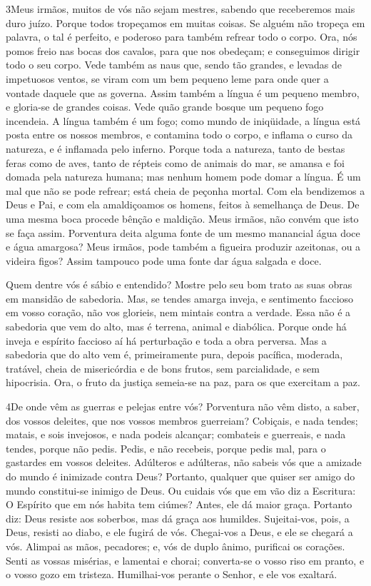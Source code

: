 \medskip

\lettrine{3} Meus irmãos, muitos de vós não sejam mestres,
sabendo que receberemos mais duro juízo. Porque todos tropeçamos
em muitas coisas. Se alguém não tropeça em palavra, o tal é
perfeito, e poderoso para também refrear todo o corpo. Ora, nós
pomos freio nas bocas dos cavalos, para que nos obedeçam; e
conseguimos dirigir todo o seu corpo. Vede também as naus que,
sendo tão grandes, e levadas de impetuosos ventos, se viram com um
bem pequeno leme para onde quer a vontade daquele que as governa.
Assim também a língua é um pequeno membro, e gloria-se de
grandes coisas. Vede quão grande bosque um pequeno fogo incendeia.
A língua também é um fogo; como mundo de iniqüidade, a língua
está posta entre os nossos membros, e contamina todo o corpo, e
inflama o curso da natureza, e é inflamada pelo inferno. Porque
toda a natureza, tanto de bestas feras como de aves, tanto de
répteis como de animais do mar, se amansa e foi domada pela natureza
humana; mas nenhum homem pode domar a língua. É um mal que não
se pode refrear; está cheia de peçonha mortal. Com ela
bendizemos a Deus e Pai, e com ela amaldiçoamos os homens, feitos à
semelhança de Deus. De uma mesma boca procede bênção e
maldição. Meus irmãos, não convém que isto se faça assim.
Porventura deita alguma fonte de um mesmo manancial água doce
e água amargosa? Meus irmãos, pode também a figueira produzir
azeitonas, ou a videira figos? Assim tampouco pode uma fonte dar
água salgada e doce.

Quem dentre vós é sábio e entendido? Mostre pelo seu bom trato as
suas obras em mansidão de sabedoria. Mas, se tendes amarga
inveja, e sentimento faccioso em vosso coração, não vos glorieis,
nem mintais contra a verdade. Essa não é a sabedoria que vem
do alto, mas é terrena, animal e diabólica. Porque onde há
inveja e espírito faccioso aí há perturbação e toda a obra perversa.
Mas a sabedoria que do alto vem é, primeiramente pura, depois
pacífica, moderada, tratável, cheia de misericórdia e de bons
frutos, sem parcialidade, e sem hipocrisia. Ora, o fruto da
justiça semeia-se na paz, para os que exercitam a paz.

\medskip

\lettrine{4} De onde vêm as guerras e pelejas entre vós?
Porventura não vêm disto, a saber, dos vossos deleites, que nos
vossos membros guerreiam? Cobiçais, e nada tendes; matais, e
sois invejosos, e nada podeis alcançar; combateis e guerreais, e
nada tendes, porque não pedis. Pedis, e não recebeis, porque
pedis mal, para o gastardes em vossos deleites. Adúlteros e
adúlteras, não sabeis vós que a amizade do mundo é inimizade contra
Deus? Portanto, qualquer que quiser ser amigo do mundo constitui-se
inimigo de Deus. Ou cuidais vós que em vão diz a Escritura: O
Espírito que em nós habita tem ciúmes? Antes, ele dá maior
graça. Portanto diz: Deus resiste aos soberbos, mas dá graça aos
humildes. Sujeitai-vos, pois, a Deus, resisti ao diabo, e ele
fugirá de vós. Chegai-vos a Deus, e ele se chegará a vós.
Alimpai as mãos, pecadores; e, vós de duplo ânimo, purificai os
corações. Senti as vossas misérias, e lamentai e chorai;
converta-se o vosso riso em pranto, e o vosso gozo em tristeza.
Humilhai-vos perante o Senhor, e ele vos exaltará.

